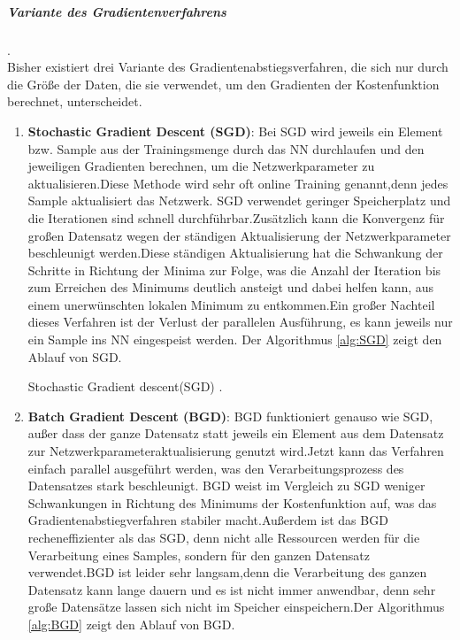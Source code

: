 \documentclass[12pt,a4paper]{scrartcl}
\numberwithin{equation}{section}
\begin{document}
\subparagraph{ Variante des Gradientenverfahrens}.\\
Bisher existiert drei Variante des Gradientenabstiegsverfahren, die sich nur durch die Größe der Daten, die sie verwendet, um den Gradienten der Kostenfunktion berechnet, unterscheidet.
\begin{enumerate}
	\item \textbf{Stochastic Gradient Descent (SGD)}:
	Bei SGD wird jeweils ein Element bzw. Sample aus der Trainingsmenge durch das \ac{NN} durchlaufen und den jeweiligen Gradienten berechnen, um die Netzwerkparameter zu aktualisieren.Diese Methode wird sehr oft online Training  genannt,denn jedes Sample aktualisiert das Netzwerk. SGD verwendet geringer Speicherplatz und die Iterationen sind schnell durchführbar.Zusätzlich kann die Konvergenz für großen Datensatz wegen der ständigen Aktualisierung der Netzwerkparameter beschleunigt werden.Diese ständigen Aktualisierung hat die Schwankung der Schritte in Richtung der Minima zur Folge, was die Anzahl der Iteration bis zum Erreichen des Minimums deutlich ansteigt und dabei helfen kann, aus einem unerwünschten lokalen Minimum zu entkommen.Ein großer Nachteil dieses Verfahren ist der Verlust der parallelen Ausführung, es kann jeweils nur ein Sample ins \ac{NN} eingespeist werden. Der Algorithmus \ref{alg:SGD} zeigt den Ablauf von SGD.
	\begin{algorithm}
		
		\DontPrintSemicolon
		
		\caption{Stochastic Gradient descent(SGD) \cite{CNNStory}.}
		\label{alg:SGD}
	\end{algorithm}

	\item  \textbf{Batch Gradient Descent (BGD)}:
	BGD funktioniert genauso wie SGD, außer dass der ganze Datensatz statt jeweils ein Element aus dem Datensatz zur Netzwerkparameteraktualisierung genutzt wird.Jetzt kann das Verfahren einfach parallel ausgeführt werden, was den Verarbeitungsprozess des Datensatzes stark beschleunigt. BGD weist im Vergleich zu SGD weniger Schwankungen in Richtung des Minimums der Kostenfunktion auf, was das Gradientenabstiegverfahren stabiler macht.Außerdem ist das BGD recheneffizienter als das SGD, denn nicht alle Ressourcen werden für die Verarbeitung eines Samples, sondern für den ganzen Datensatz verwendet.BGD ist leider sehr langsam,denn die Verarbeitung des ganzen Datensatz kann lange dauern und es ist nicht immer anwendbar, denn sehr große Datensätze lassen sich nicht im Speicher einspeichern.Der Algorithmus \ref{alg:BGD} zeigt den Ablauf von BGD.
	\begin{algorithm}
		

\end{algorithm}
\end{enumerate}
\end{document}

